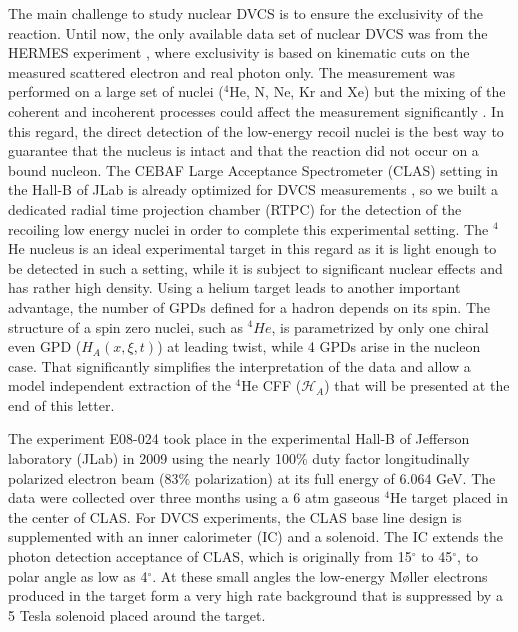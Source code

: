 \documentclass[nofootinbib,twocolumn,showpacs,prl,superscriptaddress,secnumarabic,amssymb,nobibnotes,aps,floatfix,preprint]{revtex4}
\begin{document}
The main challenge to study nuclear DVCS is to ensure the exclusivity of 
the reaction. Until now, the only available data set of nuclear DVCS
was from the HERMES experiment \cite{Ellinghaus:2002zw}, where exclusivity is 
based on kinematic cuts on the measured scattered electron and real photon only. 
The measurement was performed on a large set of nuclei ($^4$He, N, Ne, Kr and 
Xe) but the mixing of the coherent and incoherent processes could affect the
measurement significantly \cite{Guzey:2003jh}. In this regard, the direct 
detection of the low-energy 
recoil nuclei is the best way to guarantee that the nucleus is intact and that 
the reaction did not occur on a bound nucleon. The 
CEBAF Large Acceptance 
Spectrometer (CLAS) setting  in the Hall-B of JLab is already optimized for 
DVCS measurements 
\cite{Girod:2007aa,Gavalian:2009,Seder:2015,Pisano:2015,Jo:2015ema}, 
so we built a dedicated radial time projection chamber (RTPC) for the detection of 
the recoiling low energy nuclei in order to complete this experimental setting.  
The $^4$He nucleus is an ideal experimental target in this regard as it is 
light enough to be detected in such a setting, while it
is subject to significant nuclear effects \cite{JSeely} and has rather high 
density. Using a helium target leads to another important advantage, the number of GPDs 
defined for a hadron depends on its spin. The structure of a spin zero nuclei, such as 
$^4He$, is parametrized by only one chiral even GPD ($H_{A}(x,\xi,t)$) at 
leading twist, while 4 GPDs arise in the nucleon case. That significantly
simplifies the interpretation of the data and allow a model independent
extraction of the $^4$He CFF ($\mathcal{H}_{A}$) that will be presented at the
end of this letter. 


The experiment E08-024 took place in the experimental Hall-B of Jefferson 
laboratory (JLab) in 2009 using the nearly 100\% duty factor longitudinally 
polarized electron beam (83$\%$ polarization) at its full energy of 6.064 
GeV. The data were collected over three months using a 6 atm gaseous $^4$He 
target placed in the center of CLAS. For DVCS experiments, the CLAS base line 
design \cite{Mecking:2003zu} is supplemented with an inner calorimeter (IC) and 
a solenoid. The IC extends the photon detection acceptance of CLAS, which is 
originally from 15$^{\circ}$ to 45$^{\circ}$, to polar angle as low as 
4$^{\circ}$. At these small angles the low-energy M\o{}ller electrons produced 
in the target form a very high rate background that is
suppressed by a 5 Tesla solenoid placed around the target. 
\end{document}
